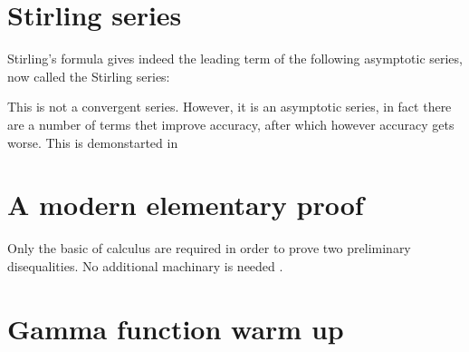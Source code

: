 \documentclass[onecolumn,a4paper,11pt]{article}
\theoremstyle{classicdef}
\theoremstyle{remark}
\begin{document}
\section{Stirling series}

Stirling's formula gives indeed the leading term of the following asymptotic
series, now called the Stirling series:


This is not a convergent series.
However, it is an asymptotic series, in fact there are a number of terms thet
improve accuracy, after which however accuracy gets worse. This is demonstarted
in

\section{A modern elementary proof\label{sec:Michael}}
Only 
the basic of calculus are required 
in order to prove two  preliminary  disequalities. No additional machinary is
needed%
\autocite[The original paper is][]{Michael:2002}.

\appendix
\section{Gamma function warm up}
\label{sec:Gamma}
%
\end{document}
